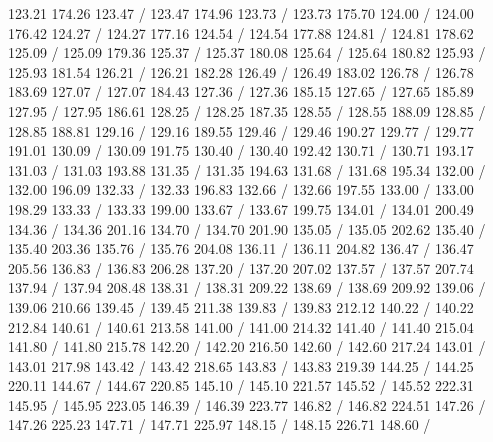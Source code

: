 { 123.21 174.26 123.47 /
 123.47 174.96 123.73 /
 123.73 175.70 124.00 /
 124.00 176.42 124.27 /
 124.27 177.16 124.54 /
 124.54 177.88 124.81 /
 124.81 178.62 125.09 /
 125.09 179.36 125.37 /
 125.37 180.08 125.64 /
 125.64 180.82 125.93 /
 125.93 181.54 126.21 /
 126.21 182.28 126.49 /
 126.49 183.02 126.78 /
 126.78 183.69 127.07 /
 127.07 184.43 127.36 /
 127.36 185.15 127.65 /
 127.65 185.89 127.95 /
 127.95 186.61 128.25 /
 128.25 187.35 128.55 /
 128.55 188.09 128.85 /
 128.85 188.81 129.16 /
 129.16 189.55 129.46 /
 129.46 190.27 129.77 /
 129.77 191.01 130.09 /
 130.09 191.75 130.40 /
 130.40 192.42 130.71 /
 130.71 193.17 131.03 /
 131.03 193.88 131.35 /
 131.35 194.63 131.68 /
 131.68 195.34 132.00 /
 132.00 196.09 132.33 /
 132.33 196.83 132.66 /
 132.66 197.55 133.00 /
 133.00 198.29 133.33 /
 133.33 199.00 133.67 /
 133.67 199.75 134.01 /
 134.01 200.49 134.36 /
 134.36 201.16 134.70 /
 134.70 201.90 135.05 /
 135.05 202.62 135.40 /
 135.40 203.36 135.76 /
 135.76 204.08 136.11 /
 136.11 204.82 136.47 /
 136.47 205.56 136.83 /
 136.83 206.28 137.20 /
 137.20 207.02 137.57 /
 137.57 207.74 137.94 /
 137.94 208.48 138.31 /
 138.31 209.22 138.69 /
 138.69 209.92 139.06 /
 139.06 210.66 139.45 /
 139.45 211.38 139.83 /
 139.83 212.12 140.22 /
 140.22 212.84 140.61 /
 140.61 213.58 141.00 /
 141.00 214.32 141.40 /
 141.40 215.04 141.80 /
 141.80 215.78 142.20 /
 142.20 216.50 142.60 /
 142.60 217.24 143.01 /
 143.01 217.98 143.42 /
 143.42 218.65 143.83 /
 143.83 219.39 144.25 /
 144.25 220.11 144.67 /
 144.67 220.85 145.10 /
 145.10 221.57 145.52 /
 145.52 222.31 145.95 /
 145.95 223.05 146.39 /
 146.39 223.77 146.82 /
 146.82 224.51 147.26 /
 147.26 225.23 147.71 /
 147.71 225.97 148.15 /
 148.15 226.71 148.60 /
}
